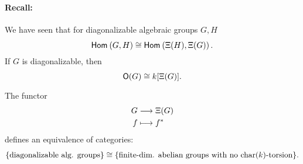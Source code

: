 \paragraph{Recall:} We have seen that for diagonalizable algebraic groups $G,H$
\[ \textsf{Hom}_{}\left(G, H\right) \overset{}{\cong} \textsf{Hom}_{}\left(\Xi(H), \Xi(G)\right). \]
If $G$ is diagonalizable, then
\[ \mathsf{O}(G) \overset{}{\cong} k[\Xi(G)]. \]

\begin{theorem}
The functor
\begin{align*}
G & \overset{}{\longrightarrow} \Xi(G)\\
f &\longmapsto f^*
\end{align*}
defines an equivalence of categories:
\[ \{\text{diagonalizable alg. groups}\} \overset{}{\cong} \{ \text{finite-dim. abelian groups with no }\mathrm{char}(k)\text{-torsion} \}. \]
\end{theorem}

